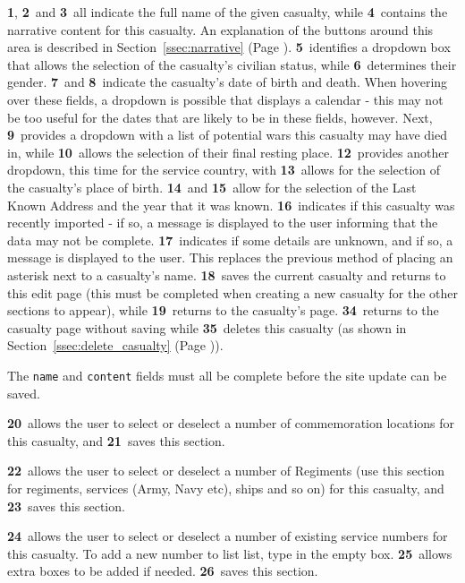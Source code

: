 \documentclass[12pt]{article}
\newcommand{\marker}[1]{\color{red}\textbf{#1}\color{black}}
\newcommand{\myref}[1]{\ref{#1} {\scriptsize(Page \pageref{#1})}}
\begin{document}
\marker{1}, \marker{2}\ and \marker{3}\ all indicate the full name of the given casualty, while \marker{4}\ contains the narrative content for this casualty. An explanation of the buttons around this area is described in Section~\myref{ssec:narrative}. \marker{5}\ identifies a dropdown box that allows the selection of the casualty's civilian status, while \marker{6}\ determines their gender. \marker{7}\ and \marker{8}\ indicate the casualty's date of birth and death. When hovering over these fields, a dropdown is possible that displays a calendar - this may not be too useful for the dates that are likely to be in these fields, however. Next, \marker{9}\ provides a dropdown with a list of potential wars this casualty may have died in, while \marker{10}\ allows the selection of their final resting place. \marker{12}\ provides another dropdown, this time for the service country, with \marker{13}\ allows for the selection of the casualty's place of birth. \marker{14}\ and \marker{15}\ allow for the selection of the Last Known Address and the year that it was known. \marker{16}\ indicates if this casualty was recently imported - if so, a message is displayed to the user informing that the data may not be complete. \marker{17}\ indicates if some details are unknown, and if so, a message is displayed to the user. This replaces the previous method of placing an asterisk next to a casualty's name. \marker{18}\ saves the current casualty and returns to this edit page (this must be completed when creating a new casualty for the other sections to appear), while \marker{19}\ returns to the casualty's page. \marker{34}\ returns to the casualty page without saving while \marker{35}\ deletes this casualty (as shown in Section~\myref{ssec:delete_casualty}).

\begin{infoBox}
The \texttt{name} and \texttt{content} fields must all be complete before the site update can be saved.
\end{infoBox}

\marker{20}\ allows the user to select or deselect a number of commemoration locations for this casualty, and \marker{21}\ saves this section.

\marker{22}\ allows the user to select or deselect a number of Regiments (use this section for regiments, services (Army, Navy etc), ships and so on) for this casualty, and \marker{23}\ saves this section.

\marker{24}\ allows the user to select or deselect a number of existing service numbers for this casualty. To add a new number to list list, type in the empty box. \marker{25}\ allows extra boxes to be added if needed. \marker{26}\ saves this section.
\end{document}
